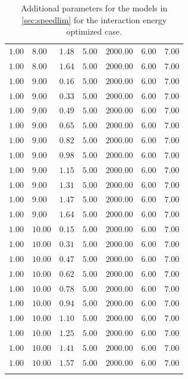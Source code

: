 \begin{longtable}[c]{lllllll}
   $1.00$  & $8.00$  & $1.48$   & $5.00$ & $2000.00$ & $6.00$               & $7.00$      \\
   $1.00$  & $8.00$  & $1.64$   & $5.00$ & $2000.00$ & $6.00$               & $7.00$      \\
   $1.00$  & $9.00$  & $0.16$   & $5.00$ & $2000.00$ & $6.00$               & $7.00$      \\
   $1.00$  & $9.00$  & $0.33$   & $5.00$ & $2000.00$ & $6.00$               & $7.00$      \\
   $1.00$  & $9.00$  & $0.49$   & $5.00$ & $2000.00$ & $6.00$               & $7.00$      \\
   $1.00$  & $9.00$  & $0.65$   & $5.00$ & $2000.00$ & $6.00$               & $7.00$      \\
   $1.00$  & $9.00$  & $0.82$   & $5.00$ & $2000.00$ & $6.00$               & $7.00$      \\
   $1.00$  & $9.00$  & $0.98$   & $5.00$ & $2000.00$ & $6.00$               & $7.00$      \\
   $1.00$  & $9.00$  & $1.15$   & $5.00$ & $2000.00$ & $6.00$               & $7.00$      \\
   $1.00$  & $9.00$  & $1.31$   & $5.00$ & $2000.00$ & $6.00$               & $7.00$      \\
   $1.00$  & $9.00$  & $1.47$   & $5.00$ & $2000.00$ & $6.00$               & $7.00$      \\
   $1.00$  & $9.00$  & $1.64$   & $5.00$ & $2000.00$ & $6.00$               & $7.00$      \\
   $1.00$  & $10.00$ & $0.15$   & $5.00$ & $2000.00$ & $6.00$               & $7.00$      \\
   $1.00$  & $10.00$ & $0.31$   & $5.00$ & $2000.00$ & $6.00$               & $7.00$      \\
   $1.00$  & $10.00$ & $0.47$   & $5.00$ & $2000.00$ & $6.00$               & $7.00$      \\
   $1.00$  & $10.00$ & $0.62$   & $5.00$ & $2000.00$ & $6.00$               & $7.00$      \\
   $1.00$  & $10.00$ & $0.78$   & $5.00$ & $2000.00$ & $6.00$               & $7.00$      \\
   $1.00$  & $10.00$ & $0.94$   & $5.00$ & $2000.00$ & $6.00$               & $7.00$      \\
   $1.00$  & $10.00$ & $1.10$   & $5.00$ & $2000.00$ & $6.00$               & $7.00$      \\
   $1.00$  & $10.00$ & $1.25$   & $5.00$ & $2000.00$ & $6.00$               & $7.00$      \\
   $1.00$  & $10.00$ & $1.41$   & $5.00$ & $2000.00$ & $6.00$               & $7.00$      \\
   $1.00$  & $10.00$ & $1.57$   & $5.00$ & $2000.00$ & $6.00$               & $7.00$      \\
  \bottomrule
  \caption{\label{tab:plus_mod_en}Additional parameters for the models in
     \cref{sec:speedlim} for the interaction energy optimized case.}
\end{longtable}


